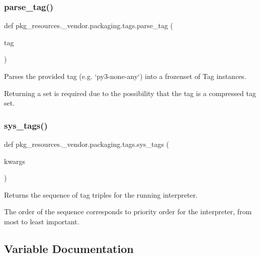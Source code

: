 \subsubsection{\texorpdfstring{parse\+\_\+tag()}{parse\_tag()}}
{\footnotesize\ttfamily def pkg\+\_\+resources.\+\_\+vendor.\+packaging.\+tags.\+parse\+\_\+tag (\begin{DoxyParamCaption}\item[{}]{tag }\end{DoxyParamCaption})}

\begin{DoxyVerb}Parses the provided tag (e.g. `py3-none-any`) into a frozenset of Tag instances.

Returning a set is required due to the possibility that the tag is a
compressed tag set.
\end{DoxyVerb}
 \mbox{\label{namespacepkg__resources_1_1__vendor_1_1packaging_1_1tags_a3cdbc6acaa0720ae27edf8494739cdcb}} 
\subsubsection{\texorpdfstring{sys\+\_\+tags()}{sys\_tags()}}
{\footnotesize\ttfamily def pkg\+\_\+resources.\+\_\+vendor.\+packaging.\+tags.\+sys\+\_\+tags (\begin{DoxyParamCaption}\item[{}]{kwargs }\end{DoxyParamCaption})}

\begin{DoxyVerb}Returns the sequence of tag triples for the running interpreter.

The order of the sequence corresponds to priority order for the
interpreter, from most to least important.
\end{DoxyVerb}
 

\subsection{Variable Documentation}
\mbox{\label{namespacepkg__resources_1_1__vendor_1_1packaging_1_1tags_ab56f94ed2c38297e5e8e561fb595b71d}} 
